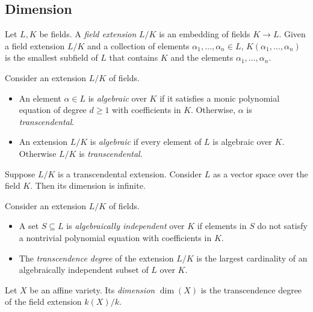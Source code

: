 \documentclass{article}
\begin{document}
\subsection{Dimension}

\begin{definition}
  Let $L,K$ be fields. A \emph{field extension} $L/K$ is an embedding of fields $K\to L$.
  Given a field extension $L/K$ and a collection of elements $\alpha_1,\ldots,\alpha_n\in L$,
  $K(\alpha_1,\ldots,\alpha_n)$ is the smallest subfield of $L$ that contains $K$ and the
  elements $\alpha_1,\ldots,\alpha_n$.
\end{definition}

\begin{definition}
  Consider an extension $L/K$ of fields.
  \begin{itemize}
    \item An element $\alpha\in L$ is \emph{algebraic} over $K$ if it satisfies a monic
      polynomial equation of degree $d\geq 1$ with coefficients in $K$. Otherwise, $\alpha$
      is \emph{transcendental}.
    \item An extension $L/K$ is \emph{algebraic} if every element of $L$ is algebraic over $K$.
      Otherwise $L/K$ is \emph{transcendental}.
  \end{itemize}
\end{definition}

\begin{proposition}
  Suppose $L/K$ is a transcendental extension. Consider $L$ as a vector space over the field
  $K$. Then its dimension is infinite.
\end{proposition}

\begin{definition}
  Consider an extension $L/K$ of fields.
  \begin{itemize}
    \item A set $S\subseteq L$ is \emph{algebraically independent} over $K$ if elements in
      $S$ do not satisfy a nontrivial polynomial equation with coefficients in $K$.
    \item The \emph{transcendence degree} of the extension $L/K$ is the largest cardinality
      of an algebraically independent subset of $L$ over $K$.
  \end{itemize}
\end{definition}

\begin{definition}
  Let $X$ be an affine variety. Its \emph{dimension} $\dim(X)$ is the transcendence
  degree of the field extension $k(X)/k$.
\end{definition}
\end{document}

